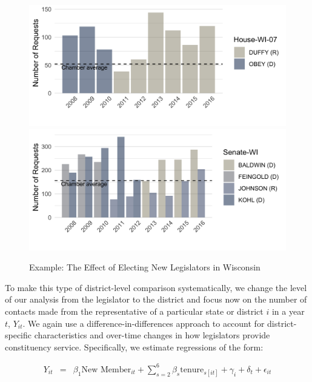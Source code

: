 \documentclass[12pt]{article}
\begin{document}
{\begin{figure}[hb!]
\centering
\caption{Example: The Effect of Electing New Legislators in Wisconsin} \label{f:wi}
\includegraphics[width = .8\textwidth]{figs/districts/(WI-07)}
\includegraphics[width = .8\textwidth]{figs/districts/(WI)}
\end{figure}

To make this type of district-level comparison systematically, we change the level of our analysis from the legislator to the district and focus now on the number of contacts made from the representative of a particular state or district $i$ in a year $t$, $Y_{it}$. We again use a difference-in-differences approach to account for district-specific characteristics and over-time changes in how legislators provide constituency service. Specifically, we estimate regressions of the form: 


\begin{eqnarray}
Y_{it} & = & \beta_{1}\text{New Member}_{it} + \sum_{s = 2}^{6} \beta_{s} \text{tenure}_{s[it]} + \gamma_{i} + \delta_{t} + \epsilon_{it} \label{e:district1} 
\end{eqnarray}

}
\end{document}
